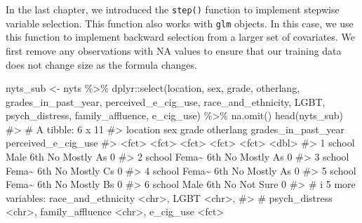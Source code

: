 \documentclass[
  letterpaper,
]{latex/krantz}
\makeatletter
\newenvironment{Shaded}{\begin{snugshade}}{\end{snugshade}}
\newcommand{\CommentTok}[1]{\textcolor[rgb]{0.37,0.37,0.37}{#1}}
\newcommand{\FunctionTok}[1]{\textcolor[rgb]{0.28,0.35,0.67}{#1}}
\newcommand{\NormalTok}[1]{\textcolor[rgb]{0.00,0.23,0.31}{#1}}
\newcommand{\OtherTok}[1]{\textcolor[rgb]{0.00,0.23,0.31}{#1}}
\newcommand{\SpecialCharTok}[1]{\textcolor[rgb]{0.37,0.37,0.37}{#1}}
\newenvironment{kframe}{%
\medskip{}
\setlength{\fboxsep}{.8em}
 \def\at@end@of@kframe{}%
 \ifinner\ifhmode%
  \def\at@end@of@kframe{\end{minipage}}%
  \begin{minipage}{\columnwidth}%
 \fi\fi%
 \def\FrameCommand##1{\hskip\@totalleftmargin \hskip-\fboxsep
 \colorbox{shadecolor}{##1}\hskip-\fboxsep
     \hskip-\linewidth \hskip-\@totalleftmargin \hskip\columnwidth}%
 \MakeFramed {\advance\hsize-\width
   \@totalleftmargin\z@ \linewidth\hsize
   \@setminipage}}%
 {\par\unskip\endMakeFramed%
 \at@end@of@kframe}
\renewenvironment{Shaded}{\begin{kframe}}{\end{kframe}}
\makeatother
\begin{document}
In the last chapter, we introduced the
\texttt{step()} function to
implement stepwise variable selection. This function also works with
\texttt{glm} objects. In this case, we use this function to implement
backward selection from a larger set of covariates. We first remove any
observations with NA values to ensure that our training data does not
change size as the formula changes.

\begin{Shaded}
\begin{Highlighting}[]
\NormalTok{nyts\_sub }\OtherTok{\textless{}{-}}\NormalTok{ nyts }\SpecialCharTok{\%\textgreater{}\%} 
\NormalTok{  dplyr}\SpecialCharTok{::}\FunctionTok{select}\NormalTok{(location, sex, grade, otherlang, grades\_in\_past\_year, }
\NormalTok{                perceived\_e\_cig\_use, race\_and\_ethnicity, LGBT, }
\NormalTok{                psych\_distress, family\_affluence, e\_cig\_use) }\SpecialCharTok{\%\textgreater{}\%}
  \FunctionTok{na.omit}\NormalTok{()}
\FunctionTok{head}\NormalTok{(nyts\_sub)}
\CommentTok{\#\textgreater{} \# A tibble: 6 x 11}
\CommentTok{\#\textgreater{}   location sex   grade otherlang grades\_in\_past\_year perceived\_e\_cig\_use}
\CommentTok{\#\textgreater{}   \textless{}fct\textgreater{}    \textless{}fct\textgreater{} \textless{}fct\textgreater{} \textless{}fct\textgreater{}     \textless{}fct\textgreater{}                             \textless{}dbl\textgreater{}}
\CommentTok{\#\textgreater{} 1 school   Male  6th   No        Mostly A\textquotesingle{}s                            0}
\CommentTok{\#\textgreater{} 2 school   Fema\textasciitilde{} 6th   No        Mostly A\textquotesingle{}s                            0}
\CommentTok{\#\textgreater{} 3 school   Fema\textasciitilde{} 6th   No        Mostly C\textquotesingle{}s                            0}
\CommentTok{\#\textgreater{} 4 school   Fema\textasciitilde{} 6th   No        Mostly A\textquotesingle{}s                            0}
\CommentTok{\#\textgreater{} 5 school   Fema\textasciitilde{} 6th   No        Mostly B\textquotesingle{}s                            0}
\CommentTok{\#\textgreater{} 6 school   Male  6th   No        Not Sure                              0}
\CommentTok{\#\textgreater{} \# i 5 more variables: race\_and\_ethnicity \textless{}chr\textgreater{}, LGBT \textless{}chr\textgreater{},}
\CommentTok{\#\textgreater{} \#   psych\_distress \textless{}chr\textgreater{}, family\_affluence \textless{}chr\textgreater{}, e\_cig\_use \textless{}fct\textgreater{}}
\end{Highlighting}
\end{Shaded}
\end{document}

